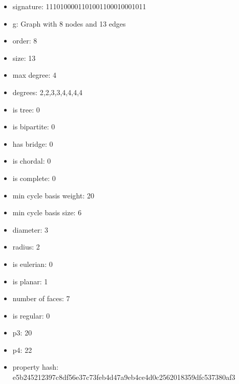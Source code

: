 \begin{itemize}
\item signature: 1110100001101001100010001011
\item g: Graph with 8 nodes and 13 edges
\item order: 8
\item size: 13
\item max degree: 4
\item degrees: 2,2,3,3,4,4,4,4
\item is tree: 0
\item is bipartite: 0
\item has bridge: 0
\item is chordal: 0
\item is complete: 0
\item min cycle basis weight: 20
\item min cycle basis size: 6
\item diameter: 3
\item radius: 2
\item is eulerian: 0
\item is planar: 1
\item number of faces: 7
\item is regular: 0
\item p3: 20
\item p4: 22
\item property hash: e5b245212397c8df56e37c73feb4d47a9eb4ce4d0c2562018359dfc537380af3
\end{itemize}
\newpage
\begin{figure}
\end{figure}
